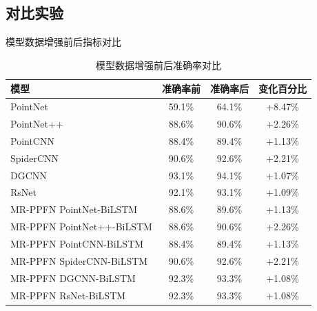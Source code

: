 \subsection{对比实验}

\begin{table}[htbp]
    \caption{模型数据增强前后指标对比}
    \label{tab:metric-comparison}
    \centering

    \begin{subtable}{\linewidth}
        \centering
        \caption{模型数据增强前后准确率对比}
        \begin{tabular}{lccc}
            \toprule
            \textbf{模型} & \textbf{准确率前} & \textbf{准确率后} & \textbf{变化百分比} \\
            \midrule
            PointNet & 59.1\% & 64.1\% & +8.47\% \\
            PointNet++ & 88.6\% & 90.6\% & +2.26\% \\
            PointCNN & 88.4\% & 89.4\% & +1.13\% \\
            SpiderCNN & 90.6\% & 92.6\% & +2.21\% \\
            DGCNN & 93.1\% & 94.1\% & +1.07\% \\
            RsNet & 92.1\% & 93.1\% & +1.09\% \\
            MR-PPFN PointNet-BiLSTM & 88.6\% & 89.6\% & +1.13\% \\
            MR-PPFN PointNet++-BiLSTM & 88.6\% & 90.6\% & +2.26\% \\
            MR-PPFN PointCNN-BiLSTM & 88.4\% & 89.4\% & +1.13\% \\
            MR-PPFN SpiderCNN-BiLSTM & 90.6\% & 92.6\% & +2.21\% \\
            MR-PPFN DGCNN-BiLSTM & 92.3\% & 93.3\% & +1.08\% \\
            MR-PPFN RsNet-BiLSTM & 92.3\% & 93.3\% & +1.08\% \\
            \bottomrule
        \end{tabular}
        \label{tab:accuracy-comparison}
    \end{subtable}

    \vspace{0.4cm}


\end{table}

